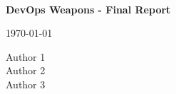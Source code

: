 \begin{titlepage}
    \centering
    \\
    \vspace*{\fill}
    {\LARGE \textbf{DevOps Weapons - Final Report} \par}
    \vspace{1cm}
    {\large \today \par}
    \vspace{1cm}
    {\large Author 1 \\ Author 2 \\ Author 3 \par}
    \vspace*{\fill}
\end{titlepage}